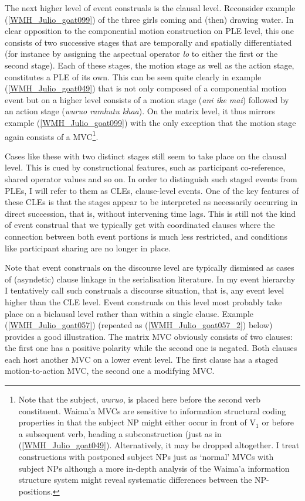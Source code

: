 The next higher level of event construals is the clausal level. Reconsider example (\ref{WMH_Julio_goat099}) of the three girls coming and (then) drawing water. In clear opposition to the componential motion construction on PLE level, this one consists of two successive stages that are temporally and spatially differentiated (for instance by assigning the aspectual operator \textit{lo} to either the first or the second stage). Each of these stages, the motion stage as well as the action stage, constitutes a PLE of its own. This can be seen quite clearly in example (\ref{WMH_Julio_goat049}) that is not only composed of a componential motion event but on a higher level consists of a motion stage (\textit{ani ike mai}) followed by an action stage (\textit{wuruo ramhutu khaa}). On the matrix level, it thus mirrors example (\ref{WMH_Julio_goat099}) with the only exception that the motion stage again consists of a MVC\footnote{Note that the subject, \textit{wuruo}, is placed here before the second verb constituent. Waima'a MVCs are sensitive to information structural coding properties in that the subject NP might either occur in front of V$_1$ or before a subsequent verb, heading a subconstruction (just as in (\ref{WMH_Julio_goat049}). Alternatively, it may be dropped altogether. I treat constructions with postponed subject NPs just as `normal' MVCs with subject NPs although a more in-depth analysis of the Waima'a information structure system might reveal systematic differences between the NP-positions.}.

Cases like these with two distinct stages still seem to take place on the clausal level. This is cued by constructional features, such as participant co-reference, shared operator values and so on. In order to distinguish such staged events from PLEs, I will refer to them as CLEs, clause-level events. One of the key features of these CLEs is that the stages appear to be interpreted as necessarily occurring in direct succession, that is, without intervening time lags. This is still not the kind of event construal that we typically get with coordinated clauses where the connection between both event portions is much less restricted, and conditions like participant sharing are no longer in place. 

Note that event construals on the discourse level are typically dismissed as cases of (asyndetic) clause linkage in the serialisation literature. In my event hierarchy I tentatively call such construals a discourse situation, that is, any event level higher than the CLE level. Event construals on this level most probably take place on a biclausal level rather than within a single clause. Example (\ref{WMH_Julio_goat057}) (repeated as (\ref{WMH_Julio_goat057_2}) below) provides a good illustration. The matrix MVC obviously consists of two clauses: the first one has a positive polarity while the second one is negated. Both clauses each host another MVC on a lower event level. The first clause has a staged motion-to-action MVC, the second one a modifying MVC.

